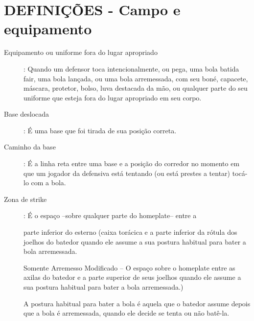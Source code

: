 \section{DEFINI\c{C}\~OES - Campo e equipamento}
\begin{description}
	\item[Equipamento ou uniforme fora do lugar apropriado]: Quando um defensor toca intencionalmente, ou pega, uma bola batida \gls{fair}, uma bola lan\c{c}ada, ou uma bola arremessada, com seu bon\'e, capacete, m\'ascara, protetor, bolso, luva destacada da m\~ao, ou qualquer parte do seu uniforme que esteja fora do lugar apropriado em seu corpo. 
	
	\item[Base deslocada]:	\'E uma base que foi tirada de sua posi\c{c}\~ao correta.
	
	\item[Caminho da base]: \'E a linha reta entre uma base e a posi\c{c}\~ao do corredor no momento em que um jogador da defensiva est\'a tentando (ou est\'a prestes a tentar) toc\'a-lo com a bola. 	
	 
	\item[Zona de \gls{strike}]: \'E o espa\c{c}o –sobre qualquer parte do \gls{homeplate}– entre a {\color{red!80}parte inferior do esterno (caixa tor\'acica	e a parte inferior da r\'otula dos joelhos do batedor quando ele assume a sua postura habitual para bater a bola arremessada. 
		
	Somente Arremesso Modificado -- O espa\c{c}o sobre o \gls{homeplate} entre as axilas do batedor e a parte superior de seus joelhos quando ele assume a sua postura habitual para bater a bola arremessada.) 
		
	A postura habitual para bater a bola \'e aquela que o batedor assume depois que a bola \'e arremessada, quando ele decide se tenta ou n\~ao bat\^e-la. }
\end{description}

